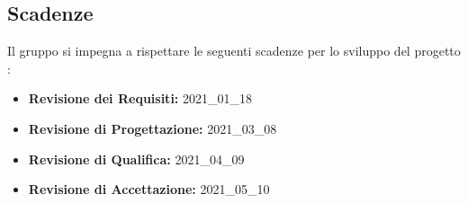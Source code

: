 \subsection{Scadenze}
\label{sub:scadenze_fissate}
Il gruppo {\Gruppo} si impegna a rispettare le seguenti scadenze per lo sviluppo del progetto \NomeProgetto:
\begin{itemize}
    \item \textbf{Revisione dei Requisiti:} 2021\_01\_18
    \item \textbf{Revisione di Progettazione:} 2021\_03\_08
    \item \textbf{Revisione di Qualifica:} 2021\_04\_09
    \item \textbf{Revisione di Accettazione:} 2021\_05\_10
\end{itemize}